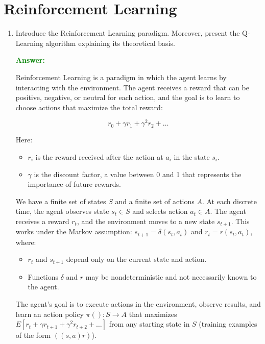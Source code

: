 \documentclass[12pt]{article}
\begin{document}
\section{Reinforcement Learning}
\begin{enumerate}[label=\textbf{RL.\arabic*}]
    \item Introduce the Reinforcement Learning paradigm.
          Moreover, present the Q-Learning algorithm explaining its theoretical basis.

          \textcolor{green}{\textbf{Answer:}}

          Reinforcement Learning is a paradigm in which the agent learns by interacting with the environment. The agent receives a reward that can be positive, negative, or neutral for each action, and the goal is to learn to choose actions that maximize the total reward:

          \[
              r_0 + \gamma r_1 + \gamma^2 r_2 + \ldots
          \]

          Here:
          \begin{itemize}
              \item $r_i$ is the reward received after the action at $a_i$ in the state $s_i$.
              \item $\gamma$ is the discount factor, a value between 0 and 1 that represents the importance of future rewards.
          \end{itemize}

          We have a finite set of states $S$ and a finite set of actions $A$. At each discrete time, the agent observes state $s_t \in S$ and selects action $a_t \in A$. The agent receives a reward $r_t$, and the environment moves to a new state $s_{t+1}$. This works under the Markov assumption: $s_{t+1} = \delta(s_t, a_t)$ and $r_t = r(s_t, a_t)$, where:
          \begin{itemize}
              \item $r_t$ and $s_{t+1}$ depend only on the current state and action.
              \item Functions $\delta$ and $r$ may be nondeterministic and not necessarily known to the agent.
          \end{itemize}

          The agent's goal is to execute actions in the environment, observe results, and learn an action policy $\pi(): S \rightarrow A$ that maximizes $E[r_t + \gamma r_{t+1} + \gamma^2 r_{t+2} + \ldots]$ from any starting state in $S$ (training examples of the form $((s, a)r)$).


\end{enumerate}
\end{document}
